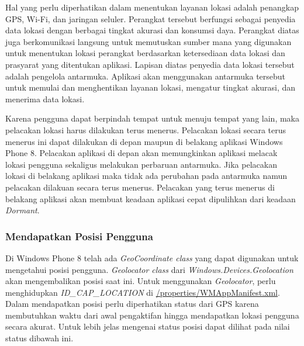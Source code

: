 Hal yang perlu diperhatikan dalam menentukan layanan lokasi adalah penangkap GPS, Wi-Fi, dan jaringan seluler. Perangkat tersebut berfungsi sebagai penyedia data lokasi dengan berbagai tingkat akurasi dan konsumsi daya. Perangkat diatas juga berkomunikasi langsung untuk memutuskan sumber mana yang digunakan untuk menentukan lokasi perangkat berdasarkan ketersediaan data lokasi dan prasyarat yang ditentukan aplikasi. Lapisan diatas penyedia data lokasi tersebut adalah pengelola antarmuka. Aplikasi akan menggunakan antarmuka tersebut untuk memulai dan menghentikan layanan lokasi, mengatur tingkat akurasi, dan menerima data lokasi.

Karena pengguna dapat berpindah tempat untuk menuju tempat yang lain, maka pelacakan lokasi harus dilakukan terus menerus. Pelacakan lokasi secara terus menerus ini dapat dilakukan di depan maupun di belakang aplikasi Windows Phone 8. Pelacakan aplikasi di depan akan memungkinkan aplikasi melacak lokasi pengguna sekaligus melakukan perbaruan antarmuka. Jika pelacakan lokasi di belakang aplikasi maka tidak ada perubahan pada antarmuka namun pelacakan dilakuan secara terus menerus. Pelacakan yang terus menerus di belakang aplikasi akan membuat keadaan aplikasi cepat dipulihkan dari keadaan \textit{Dormant}.

\subsubsection{Mendapatkan Posisi Pengguna}
\label{subsubsec:Mendapatkan Posisi Pengguna}
\hspace{0.5cm} Di Windows Phone 8 telah ada \textit{GeoCoordinate class} yang dapat digunakan untuk mengetahui posisi pengguna. \textit{Geolocator class} dari \textit{Windows.Devices.Geolocation} akan mengembalikan posisi saat ini. Untuk menggunakan \textit{Geolocator}, perlu menghidupkan \textit{ID\_CAP\_LOCATION} di \url{/properties/WMAppManifest.xml}. Dalam mendapatkan posisi perlu diperhatikan status dari GPS karena membutuhkan waktu dari awal pengaktifan hingga mendapatkan lokasi pengguna secara akurat. Untuk lebih jelas mengenai status posisi dapat dilihat pada nilai status dibawah ini.

